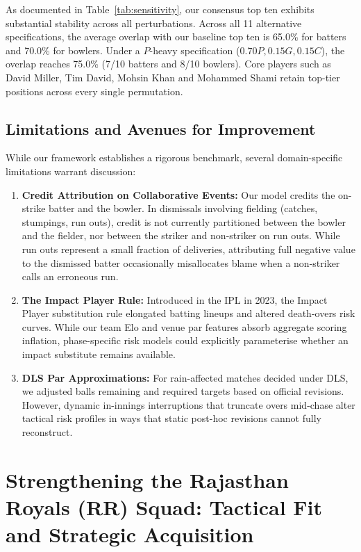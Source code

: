 \documentclass[11pt,a4paper]{article}
\begin{document}


As documented in Table~\ref{tab:sensitivity}, our consensus top ten exhibits substantial stability across all perturbations. Across all 11 alternative specifications, the average overlap with our baseline top ten is 65.0\% for batters and 70.0\% for bowlers. Under a $P$-heavy specification ($0.70 P, 0.15 G, 0.15 C$), the overlap reaches 75.0\% (7/10 batters and 8/10 bowlers). Core players such as David Miller, Tim David, Mohsin Khan and Mohammed Shami retain top-tier positions across every single permutation.

\subsection{Limitations and Avenues for Improvement}
While our framework establishes a rigorous benchmark, several domain-specific limitations warrant discussion:
\begin{enumerate}
    \item \textbf{Credit Attribution on Collaborative Events:} Our model credits the on-strike batter and the bowler. In dismissals involving fielding (catches, stumpings, run outs), credit is not currently partitioned between the bowler and the fielder, nor between the striker and non-striker on run outs. While run outs represent a small fraction of deliveries, attributing full negative value to the dismissed batter occasionally misallocates blame when a non-striker calls an erroneous run.
    \item \textbf{The Impact Player Rule:} Introduced in the IPL in 2023, the Impact Player substitution rule elongated batting lineups and altered death-overs risk curves. While our team Elo and venue par features absorb aggregate scoring inflation, phase-specific risk models could explicitly parameterise whether an impact substitute remains available.
    \item \textbf{DLS Par Approximations:} For rain-affected matches decided under DLS, we adjusted balls remaining and required targets based on official revisions. However, dynamic in-innings interruptions that truncate overs mid-chase alter tactical risk profiles in ways that static post-hoc revisions cannot fully reconstruct.
\end{enumerate}

\section{Strengthening the Rajasthan Royals (RR) Squad: Tactical Fit and Strategic Acquisition}
\label{sec:rr_squad_fit}
\end{document}
